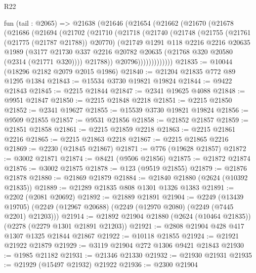 \begin{lexlean}{R22}
\begin{coremodule}
    fun (tail : @2065) =>
    @21638
      (@21646
        (@21654
          (@21662
            (@21670
              (@21678
                (@21686
                  (@21694
                    (@21702
                      (@21710
                        (@21718
                          (@21740
                            (@21748
                              (@21755
                                (@21761 (@21775 (@21787 @21788)) @20770)
                                (@21749
                                  @1291
                                  @118
                                  @2216
                                  @2216
                                  @20635
                                  @1989
                                  (@3177
                                    @21730
                                    @337
                                    @2216
                                    @20782
                                    @20635
                                    (@21768 @320 @20580 (@2314 (@21771 @320))))
                                  @21788))
                              @20796)))))))))))))
@21835 := @10044 (@18296 @2182 @2079 @2015 @1986)
@21840 := @21204 @21835 @772 @89 @1295 @1384
@21843 := @15534 @3730 @19821 @19824
@21844 := @9422 @21843
@21845 := @2215 @21844
@21847 := @2341 @19625 @4088
@21848 := @9951 @21847
@21850 := @2215 @21848 @2218
@21851 := @2215 @21850
@21852 := @2341 @19627
@21855 := @15539 @3730 @19821 @19824
@21856 := @9509 @21855
@21857 := @9531 @21856
@21858 := @21852 @21857
@21859 := @21851 @21858
@21861 := @2215 @21859 @2218
@21863 := @2215 @21861 @2216
@21865 := @2215 @21863 @2218
@21867 := @2215 @21865 @2216
@21869 := @2230 (@21845 @21867)
@21871 := @776 (@19628 @21857)
@21872 := @3002 @21871
@21874 := @8421 (@9506 @21856)
@21875 := @21872 @21874
@21876 := @3002 @21875
@21878 := @123 (@9519 @21855)
@21879 := @21876 @21878
@21880 := @21869 @21879
@21884 := @21840 @21880 (@2624 (@10392 @21835))
@21889 := @21289 @21835 @808 @1301 @1326 @1383
@21891 := @2202 (@2081 @20692)
@21892 := @21889 @21891
@21904 := @2249
    (@13439 @19705)
    (@2249 (@12967 @20688) (@2249 (@12970 @2080) (@2249 (@7445 @2201) @21203)))
@21914 := @21892 @21904 @21880 (@2624 (@10464 @21835)) (@2278 (@2279 @1301 @21891 @21203))
@21921 := @2808 @21904 @428 @417 @1307 @1325 @21844 @21867
@21922 := @10118 @21855
@21924 := @21921 @21922 @21879
@21929 := @3119 @21904 @272 @1306 @9421 @21843
@21930 := @1985 @21182
@21931 := @21346 @21330
@21932 := @21930 @21931
@21935 := @21929 (@15497 @21932) @21922
@21936 := @2300 @21904

\end{coremodule}
\end{lexlean}
